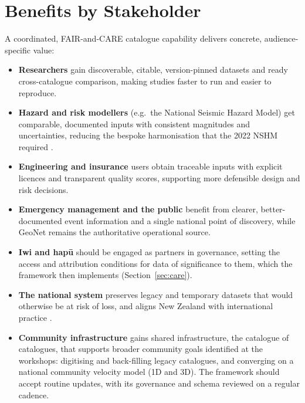 \documentclass[11pt]{article}
\begin{document}
\section{Benefits by Stakeholder}
A coordinated, FAIR-and-CARE catalogue capability delivers concrete, audience-specific value:
\begin{itemize}
\setlength{\itemsep}{2pt}
\item \textbf{Researchers} gain discoverable, citable, version-pinned datasets and ready cross-catalogue comparison, making studies faster to run and easier to reproduce.
\item \textbf{Hazard and risk modellers} (e.g.\ the National Seismic Hazard Model) get comparable, documented inputs with consistent magnitudes and uncertainties, reducing the bespoke harmonisation that the 2022 NSHM required \citep{NSHM2022BSSA, Christophersen2024}.
\item \textbf{Engineering and insurance} users obtain traceable inputs with explicit licences and transparent quality scores, supporting more defensible design and risk decisions.
\item \textbf{Emergency management and the public} benefit from clearer, better-documented event information and a single national point of discovery, while GeoNet remains the authoritative operational source.
\item \textbf{Iwi and hap\=u} should be engaged as partners in governance, setting the access and attribution conditions for data of significance to them, which the framework then implements (Section~\ref{sec:care}).
\item \textbf{The national system} preserves legacy and temporary datasets that would otherwise be at risk of loss, and aligns New Zealand with international practice \citep{EPOSSeisTCS}.
\item \textbf{Community infrastructure} gains shared infrastructure, the catalogue of catalogues, that supports broader community goals identified at the workshops: digitising and back-filling legacy catalogues, and converging on a national community velocity model (1D and 3D). The framework should accept routine updates, with its governance and schema reviewed on a regular cadence.
\end{itemize}
\end{document}
